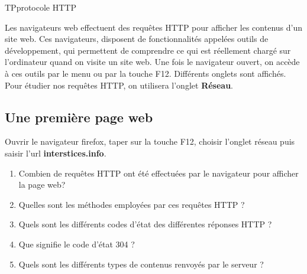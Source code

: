 \documentclass[12pt,a4paper]{article}
\begin{document}
\begin{NSI}
{TP}{protocole HTTP}
\end{NSI}


Les navigateurs web effectuent des requêtes HTTP pour afficher les contenus d'un site web. Ces navigateurs, disposent de fonctionnalités appelées outils de développement, qui permettent de comprendre ce qui est réellement chargé sur l'ordinateur quand on visite un site web.
\medskip
Une fois le navigateur ouvert, on accède à ces outils par le menu ou par la touche F12. Différents onglets sont affichés. Pour étudier nos requêtes HTTP, on utilisera l'onglet \textbf{Réseau}.

\subsection*{Une première page web}
Ouvrir le navigateur firefox, taper sur la touche F12, choisir l'onglet réseau puis saisir l'url \textbf{interstices.info}.\medskip

\begin{enumerate}
\item Combien de requêtes HTTP ont été effectuées par le navigateur pour afficher la page web? \vspace{1cm}

\item Quelles sont les méthodes employées par ces requêtes HTTP ?\vspace{1cm}

\item Quels sont les différents codes d'état des différentes réponses HTTP ? \vspace{1cm}

\item Que signifie le code d'état 304 ? \vspace{1cm}

\item Quels sont les différents types de contenus renvoyés par le serveur ? \vspace{3cm}
%
\end{enumerate}
\end{document}
